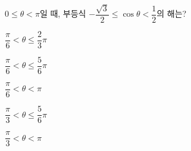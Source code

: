 $0\le\theta<\pi$일 때, 부등식 $-\dfrac{\sqrt{3}}{2}\le\cos\theta<\dfrac{1}{2}$의 해는?
\begin{choicesii}{\rule[-3ex]{0pt}{8ex}$\dfrac{\pi}{6}<\theta\le\dfrac{2}{3}\pi$}{\rule[-3ex]{0pt}{8ex}$\dfrac{\pi}{6}<\theta\le\dfrac{5}{6}\pi$}{\rule[-3ex]{0pt}{8ex}$\dfrac{\pi}{6}<\theta<\pi$}{\rule[-3ex]{0pt}{8ex}$\dfrac{\pi}{3}<\theta\le\dfrac{5}{6}\pi$}{\rule[-3ex]{0pt}{8ex}$\dfrac{\pi}{3}<\theta<\pi$}\end{choicesii}
